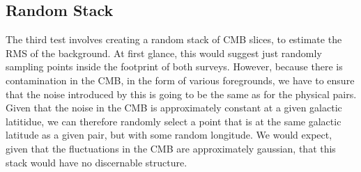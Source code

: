 \subsection{Random Stack}
The third test involves creating a random stack of CMB slices, to estimate the RMS of the background. At first glance, this would suggest just randomly sampling points inside the footprint of both surveys. However, because there is contamination in the CMB, in the form of various foregrounds, we have to ensure that the noise introduced by this is going to be the same as for the physical pairs. Given that the noise in the CMB is approximately constant at a given galactic latitidue, we can therefore randomly select a point that is at the same galactic latitude as a given pair, but with some random longitude. We would expect, given that the fluctuations in the CMB are approximately gaussian, that this stack would have no discernable structure.